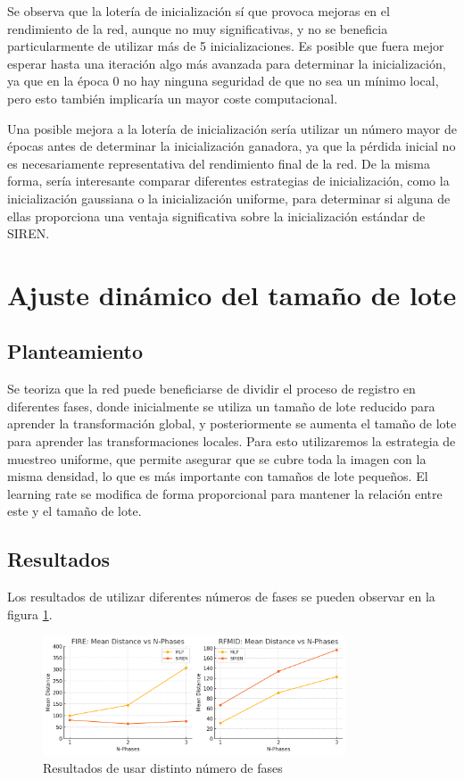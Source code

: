 Se observa que la lotería de inicialización sí que provoca mejoras en el rendimiento de la red, aunque no muy significativas, y no se beneficia particularmente de utilizar más de 5 inicializaciones.
Es posible que fuera mejor esperar hasta una iteración algo más avanzada para determinar la inicialización, ya que en la época 0 no hay ninguna seguridad de que no sea un mínimo local, pero esto también implicaría un mayor coste computacional.

Una posible mejora a la lotería de inicialización sería utilizar un número mayor de épocas antes de determinar la inicialización ganadora, ya que la pérdida inicial no es necesariamente representativa del rendimiento final de la red.
De la misma forma, sería interesante comparar diferentes estrategias de inicialización, como la inicialización gaussiana o la inicialización uniforme, para determinar si alguna de ellas proporciona una ventaja significativa sobre la inicialización estándar de SIREN.

\section{Ajuste dinámico del tamaño de lote}
\label{sec:Dynamic tamaño de lote}

\subsection{Planteamiento}
\label{subsec:Planteamento-phases}

Se teoriza que la red puede beneficiarse de dividir el proceso de registro en diferentes fases, donde inicialmente se utiliza un tamaño de lote reducido para aprender la transformación global, y posteriormente se aumenta el tamaño de lote para aprender las transformaciones locales.
Para esto utilizaremos la estrategia de muestreo uniforme, que permite asegurar que se cubre toda la imagen con la misma densidad, lo que es más importante con tamaños de lote pequeños. El learning rate se modifica de forma proporcional para mantener la relación entre este y el tamaño de lote.

\subsection{Resultados}
\label{subsec:Resultados-phases}

Los resultados de utilizar diferentes números de fases se pueden observar en la figura \ref{fig:nphases}.
\begin{figure}[tbp]
    \centering
    \includegraphics[width=0.8\textwidth]{imaxes/lottery/nphases.png}
    \caption{Resultados de usar distinto número de fases}
    \label{fig:nphases}
\end{figure}

